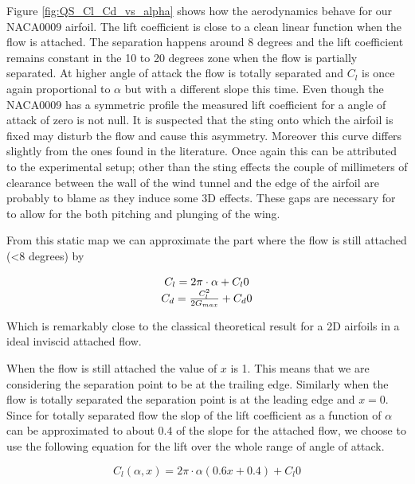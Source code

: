 \par Figure \ref{fig:QS_Cl_Cd_vs_alpha} shows how the aerodynamics behave for our NACA0009 airfoil.
The lift coefficient is close to a clean linear function when the flow is attached.
The separation happens around 8 degrees and the lift coefficient remains constant in the 10 to 20 degrees zone when the flow is partially separated.
At higher angle of attack the flow is totally separated and $C_l$ is once again proportional to $\alpha$ but with a different slope this time.
Even though the NACA0009 has a symmetric profile the measured lift coefficient for a angle of attack of zero is not null.
It is suspected that the sting onto which the airfoil is fixed may disturb the flow and cause this asymmetry.
Moreover this curve differs slightly from the ones found in the literature.
Once again this can be attributed to the experimental setup; other than the sting effects the couple of millimeters of clearance between the wall of the wind tunnel and the edge of the airfoil are probably to blame as they induce some 3D effects.
These gaps are necessary for to allow for the both pitching and plunging of the wing.

\par From this static map we can approximate the part where the flow is still attached (<8 degrees) by 

\begin{equation}
  \begin{array}[c]{c}
    C_l= 2 \pi \cdot \alpha + C_l0 \\
    C_d= \frac{C_l^2}{2G_{max}} + C_d0
  \end{array}
  \label{eqn:attached_Cl_and_Cd_vs_alpha}
\end{equation}

Which is remarkably close to the classical theoretical result for a 2D airfoils in a ideal inviscid attached flow.

When the flow is still attached the value of $x$ is 1. 
This means that we are considering the separation point to be at the trailing edge.
Similarly when the flow is totally separated the separation point is at the leading edge and $x=0$.
Since for totally separated flow the slop of the lift coefficient as a function of $\alpha$ can be approximated to about $0.4$ of the slope for the attached flow, we choose to use the following equation for the lift over the whole range of angle of attack. 

\begin{equation}
  C_l(\alpha,x)=2 \pi \cdot \alpha (0.6 x + 0.4) + C_l0
  \label{eqn:Cl_function}
\end{equation}

